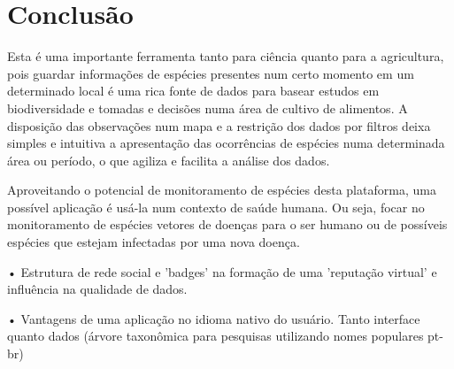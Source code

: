 \section{Conclusão}

Esta é uma importante ferramenta tanto para ciência quanto para a agricultura, pois guardar informações de espécies presentes num certo momento em um determinado local é uma rica fonte de dados para basear estudos em biodiversidade e tomadas e decisões numa área de cultivo de alimentos. A disposição das observações num mapa e a restrição dos dados por filtros deixa simples e intuitiva a apresentação das ocorrências de espécies numa determinada área ou período, o que agiliza e facilita a análise dos dados.
  
Aproveitando o potencial de monitoramento de espécies desta plataforma, uma possível aplicação é usá-la num contexto de saúde humana. Ou seja, focar no monitoramento de espécies vetores de doenças para o ser humano ou de possíveis espécies que estejam infectadas por uma nova doença.
    
• Estrutura de rede social e 'badges' na formação de uma 'reputação virtual' e influência na qualidade de dados.
    
• Vantagens de uma aplicação no idioma nativo do usuário. Tanto interface quanto dados (árvore taxonômica para pesquisas utilizando nomes populares pt-br)
